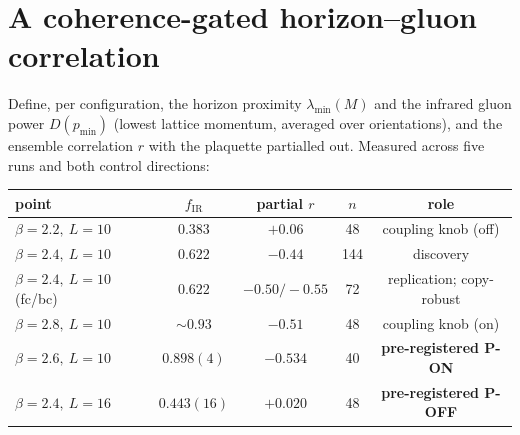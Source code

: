 \documentclass[11pt]{article}
\begin{document}
\section{A coherence-gated horizon--gluon correlation}\label{sec:law}
Define, per configuration, the horizon proximity $\lambda_{\min}(M)$ and the infrared
gluon power $D(p_{\min})$ (lowest lattice momentum, averaged over orientations), and the
ensemble correlation $r$ with the plaquette partialled out. Measured across five runs and
both control directions:

\begin{center}
\begin{tabular}{lcccc}
\toprule
point & $f_{\mathrm{IR}}$ & partial $r$ & $n$ & role\\
\midrule
$\beta=2.2,\ L=10$ & $0.383$ & $+0.06$ & 48 & coupling knob (off)\\
$\beta=2.4,\ L=10$ & $0.622$ & $-0.44$ & 144 & discovery\\
$\beta=2.4,\ L=10$ (fc/bc) & $0.622$ & $-0.50/-0.55$ & 72 & replication; copy-robust\\
$\beta=2.8,\ L=10$ & $\sim0.93$ & $-0.51$ & 48 & coupling knob (on)\\
$\beta=2.6,\ L=10$ & $0.898(4)$ & $-0.534$ & 40 & \textbf{pre-registered P-ON}\\
$\beta=2.4,\ L=16$ & $0.443(16)$ & $+0.020$ & 48 & \textbf{pre-registered P-OFF}\\
\bottomrule
\end{tabular}
\end{center}
\end{document}
